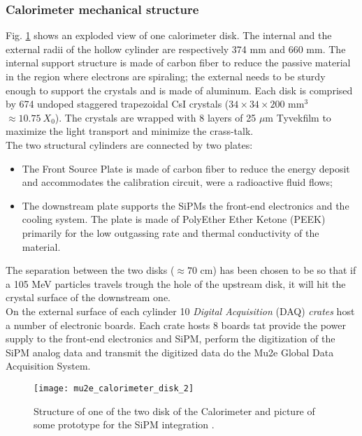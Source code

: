 \documentclass[12pt,a4paper,openright, oneside, titlepage]{book} %
\begin{document}

\subsubsection{Calorimeter mechanical structure}
Fig. \ref{_mu2e_calorimeter_disk} shows an exploded view of one calorimeter disk.
The internal and the external radii of the hollow cylinder are respectively 374 mm and 660 mm.
The internal support structure is made of carbon fiber to reduce the passive material in the region 
where electrons are spiraling; 
the external needs to be sturdy enough to support the crystals and is made of aluminum. 
Each disk is comprised by 674 undoped staggered trapezoidal CsI crystals ($34\times34\times200$ mm$^3$  $\approx10.75\ X_0$). The crystals are wrapped with 8 layers of 25 $\mu$m Tyvek\textsuperscript \textregistered film to maximize the light transport and minimize the crass-talk. \\
The two structural cylinders are connected by two plates:
\begin{itemize}
\item The Front Source Plate is made of carbon fiber to reduce the energy deposit 
and accommodates the calibration circuit, were a radioactive fluid flows;
\item The downstream plate supports the SiPMs the front-end electronics and the cooling system. 
The plate is made of PolyEther Ether Ketone (PEEK) primarily for the low outgassing rate and thermal conductivity of the material.
\end{itemize} 
The separation between the two disks ($\approx 70$ cm) has been chosen to be so that if a 105 MeV particles travels trough the hole of the upstream disk, it will hit the crystal surface of the downstream one.\\
On the external surface of each cylinder 10 \textit{Digital Acquisition }(DAQ) \textit{crates} 
host a number of electronic boards.
Each crate hosts 8 boards tat provide the power supply to the front-end electronics and SiPM,
perform the digitization of the SiPM analog data and transmit the digitized data do the Mu2e 
Global Data Acquisition System.

\begin{figure}[h!]
\centering
\texttt{[image: mu2e\_calorimeter\_disk\_2]}
\caption{Structure of one of the two disk of the Calorimeter and picture of some prototype for the SiPM integration \cite{Calorimeter:2020}.}
\label{_mu2e_calorimeter_disk}
\end{figure}
\end{document}
